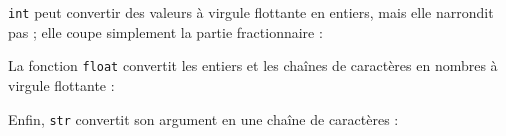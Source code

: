 \begin{Shaded}
\begin{Highlighting}[]
\OperatorTok{\textgreater{}\textgreater{}\textgreater{}} \NormalTok{(}\StringTok{\textquotesingle{}32\textquotesingle{}}\NormalTok{)}
\OperatorTok{\textgreater{}\textgreater{}\textgreater{}} \NormalTok{(}\NormalTok{)}
\NormalTok{, } \OperatorTok{\textless{}}\OperatorTok{\textgreater{}}
 \NormalTok{() }\NormalTok{: }
\end{Highlighting}
\end{Shaded}

\texttt{int} peut convertir des valeurs à virgule flottante en entiers,
mais elle n\textquotesingle arrondit pas ; elle coupe simplement la
partie fractionnaire :

\begin{Shaded}
\begin{Highlighting}[]
\OperatorTok{\textgreater{}\textgreater{}\textgreater{}} \NormalTok{(}\NormalTok{)}
\OperatorTok{\textgreater{}\textgreater{}\textgreater{}} \NormalTok{(}\OperatorTok{{-}}\NormalTok{)}
\OperatorTok{{-}}
\end{Highlighting}
\end{Shaded}

La fonction \texttt{float} convertit les entiers et les chaînes de
caractères en nombres à virgule flottante :

\begin{Shaded}
\begin{Highlighting}[]
\OperatorTok{\textgreater{}\textgreater{}\textgreater{}} \NormalTok{(}\NormalTok{)}
\OperatorTok{\textgreater{}\textgreater{}\textgreater{}} \NormalTok{(}\StringTok{\textquotesingle{}3.14159\textquotesingle{}}\NormalTok{)}
\end{Highlighting}
\end{Shaded}

Enfin, \texttt{str} convertit son argument en une chaîne de caractères :

